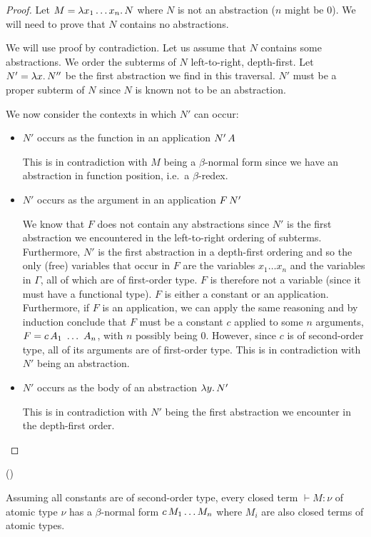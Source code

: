 \begin{proof}
  Let $M = \lambda x_1 \ldots x_n.\, N$ where $N$ is not an abstraction ($n$
  might be $0$). We will need to prove that $N$ contains no abstractions.

  We will use proof by contradiction. Let us assume that $N$ contains some
  abstractions. We order the subterms of $N$ left-to-right, depth-first.
  Let $N' = \lambda x.\, N''$ be the first abstraction we find in this
  traversal. $N'$ must be a proper subterm of $N$ since $N$ is known not to
  be an abstraction.
  
  We now consider the contexts in which $N'$ can occur:

  \begin{itemize}
  \item $N'$ occurs as the function in an application $N'\,A$
    
    This is in contradiction with $M$ being a $\beta$-normal form since we
    have an abstraction in function position, i.e.\ a $\beta$-redex.

  \item $N'$ occurs as the argument in an application $F\,N'$
    
    We know that $F$ does not contain any abstractions since $N'$ is the
    first abstraction we encountered in the left-to-right ordering of
    subterms. Furthermore, $N'$ is the first abstraction in a depth-first
    ordering and so the only (free) variables that occur in $F$ are the
    variables $x_1 \ldots x_n$ and the variables in $\Gamma$, all of which
    are of first-order type. $F$ is therefore not a variable (since it must
    have a functional type). $F$ is either a constant or an
    application. Furthermore, if $F$ is an application, we can apply the
    same reasoning and by induction conclude that $F$ must be a constant
    $c$ applied to some $n$ arguments, $F = \ap{c}{A_1\ \ldots\ A_n}$, with
    $n$ possibly being $0$. However, since $c$ is of second-order type, all
    of its arguments are of first-order type. This is in contradiction with
    $N'$ being an abstraction.

  \item $N'$ occurs as the body of an abstraction $\lambda y.\, N'$
    
    This is in contradiction with $N'$ being the first abstraction we
    encounter in the depth-first order.
  \end{itemize}
\end{proof}

\begin{corollary}\label{cor:second-order-trees}
  ()
  
  Assuming all constants are of second-order type, every closed term
  $\vdash M : \nu$ of atomic type $\nu$ has a $\beta$-normal form
  $c\,M_1 \ldots M_n$ where $M_i$ are also closed terms of atomic
  types.
\end{corollary}

